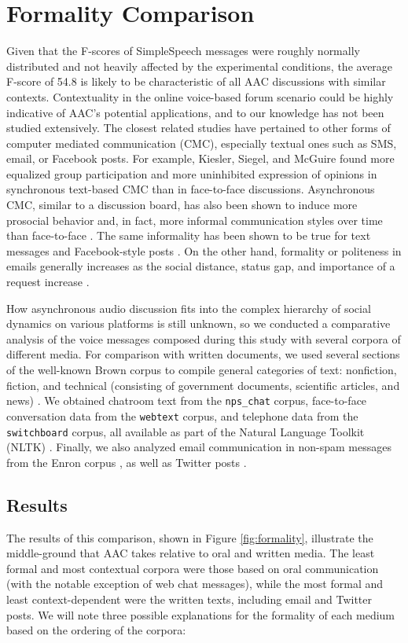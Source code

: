 \section{Formality Comparison}
Given that the F-scores of SimpleSpeech messages were roughly normally distributed and not heavily affected by the experimental conditions, the average F-score of 54.8 is likely to be characteristic of all AAC discussions with similar contexts.
Contextuality in the online voice-based forum scenario could be highly indicative of AAC's potential applications, and to our knowledge has not been studied extensively.
The closest related studies have pertained to other forms of computer mediated communication (CMC), especially textual ones such as SMS, email, or Facebook posts.
For example, Kiesler, Siegel, and McGuire \cite{kiesler} found more equalized group participation and more uninhibited expression of opinions in synchronous text-based CMC than in face-to-face discussions.
Asynchronous CMC, similar to a discussion board, has also been shown to induce more prosocial behavior and, in fact, more informal communication styles over time than face-to-face \cite{walther}.
The same informality has been shown to be true for text messages and Facebook-style posts \cite{bilal}.
On the other hand, formality or politeness in emails generally increases as the social distance, status gap, and importance of a request increase \cite{cho}.

How asynchronous audio discussion fits into the complex hierarchy of social dynamics on various platforms is still unknown, so we conducted a comparative analysis of the voice messages composed during this study with several corpora of different media.
For comparison with written documents, we used several sections of the well-known Brown corpus to compile general categories of text: nonfiction, fiction, and technical (consisting of government documents, scientific articles, and news) \cite{brown}.
We obtained chatroom text from the \texttt{nps\_chat} corpus, face-to-face conversation data from the \texttt{webtext} corpus, and telephone data from the \texttt{switchboard} corpus, all available as part of the Natural Language Toolkit (NLTK) \cite{nltk}.
Finally, we also analyzed email communication in non-spam messages from the Enron corpus \cite{enronsent}, as well as Twitter posts \cite{twitter}.

\subsection{Results}
The results of this comparison, shown in Figure \ref{fig:formality}, illustrate the middle-ground that AAC takes relative to oral and written media. 
The least formal and most contextual corpora were those based on oral communication (with the notable exception of web chat messages), while the most formal and least context-dependent were the written texts, including email and Twitter posts. 
We will note three possible explanations for the formality of each medium based on the ordering of the corpora:


